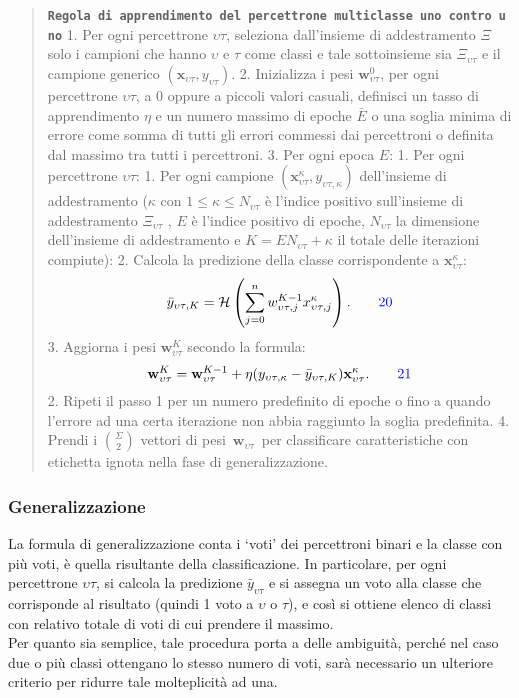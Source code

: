 \documentclass[
  letterpaper,
  DIV=11,
  numbers=noendperiod]{scrreprt}
\begin{document}
\begin{quote}
\textbf{\texttt{Regola\ di\ apprendimento\ del\ percettrone\ multiclasse\ \textquotesingle{}uno\ contro\ uno\textquotesingle{}}}
1. Per ogni percettrone \(\upsilon\tau\), seleziona dall'insieme di
addestramento \(\Xi\) solo i campioni che hanno \(\upsilon\) e \(\tau\)
come classi e tale sottoinsieme sia \(\Xi_{\upsilon\tau}\) e il campione
generico \((\mathbf{x}_{\upsilon\tau},y_{\upsilon\tau})\). 2.
Inizializza i pesi \(\mathbf{w}^0_{\upsilon\tau}\), per ogni percettrone
\(\upsilon\tau\), a \(0\) oppure a piccoli valori casuali, definisci un
tasso di apprendimento \(\eta\) e un numero massimo di epoche
\(\bar{E}\) o una soglia minima di errore come somma di tutti gli errori
commessi dai percettroni o definita dal massimo tra tutti i percettroni.
3. Per ogni epoca \(E\): 1. Per ogni percettrone \(\upsilon\tau\): 1.
Per ogni campione
\((\mathbf{x}^\kappa_{\upsilon\tau}, y_{\upsilon\tau,\kappa})\)
dell'insieme di addestramento (\(\kappa\) con
\(1≤\kappa≤N_{\upsilon\tau}\) è l'indice positivo sull'insieme di
addestramento \(\Xi_{\upsilon\tau}\) , \(E\) è l'indice positivo di
epoche, \(N_{\upsilon\tau}\) la dimensione dell'insieme di addestramento
e \(K=EN_{\upsilon\tau}+\kappa\) il totale delle iterazioni compiute):
2. Calcola la predizione della classe corrispondente a
\(\mathbf{x}^\kappa_{\upsilon\tau}\): \[
          \bar{y}_{\upsilon\tau,K}=\mathcal{H}\left(\sum_{j=0}^{n} w_{\upsilon\tau,j}^{K-1} x_{\upsilon\tau,j}^\kappa\right).\tag*{\color{blue}{20}}
          \] 3. Aggiorna i pesi \(\mathbf{w}^K_{\upsilon\tau}\) secondo
la formula: \[
          \mathbf{w}^K_{\upsilon\tau}=\mathbf{w}^{K-1}_{\upsilon\tau}+\eta(y_{\upsilon\tau,\kappa}-\bar{y}_{\upsilon\tau,K})\mathbf{x}^\kappa_{\upsilon\tau}.\tag* {\color{blue}{21}}
          \] 2. Ripeti il passo 1 per un numero predefinito di epoche o
fino a quando l'errore ad una certa iterazione non abbia raggiunto la
soglia predefinita. 4. Prendi i \(\binom{\Sigma}{2}\) vettori di
pesi~\(\mathbf{w}_{\upsilon\tau}\)~per classificare caratteristiche con
etichetta ignota nella fase di generalizzazione.
\end{quote}

\subsubsection{Generalizzazione}\label{generalizzazione-2}

La formula di generalizzazione conta i `voti' dei percettroni binari e
la classe con più voti, è quella risultante della classificazione. In
particolare, per ogni percettrone \(\upsilon\tau\), si calcola la
predizione \(\bar{y}_{\upsilon\tau}\) e si assegna un voto alla classe
che corrisponde al risultato (quindi 1 voto a \(\upsilon\) o \(\tau\)),
e così si ottiene elenco di classi con relativo totale di voti di cui
prendere il massimo.\\
Per quanto sia semplice, tale procedura porta a delle ambiguità, perché
nel caso due o più classi ottengano lo stesso numero di voti, sarà
necessario un ulteriore criterio per ridurre tale molteplicità ad una.
\end{document}
